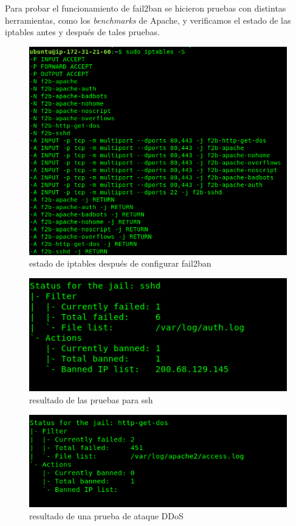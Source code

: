 \documentclass[12pt]{article}
\begin{document}
Para probar el funcionamiento de \textsf{fail2ban} se hicieron pruebas con distintas herramientas, como los \textit{benchmarks} de Apache, y verificamos el estado de las \textsf{iptables} antes y después de tales pruebas.
\begin{figure}[H]
  \centering
  \includegraphics[scale=0.3]{fail2ban/iptables}
  \caption{estado de iptables después de configurar fail2ban}
\end{figure}
\begin{figure}[H]
  \centering
  \includegraphics[scale=0.5]{fail2ban/ssh_banned_experiment}
  \caption{resultado de las pruebas para ssh}
\end{figure}
\begin{figure}[H]
  \centering
  \includegraphics[scale=0.5]{fail2ban/fakeddos_test}
  \caption{resultado de una prueba de ataque DDoS}
\end{figure}
\end{document}
